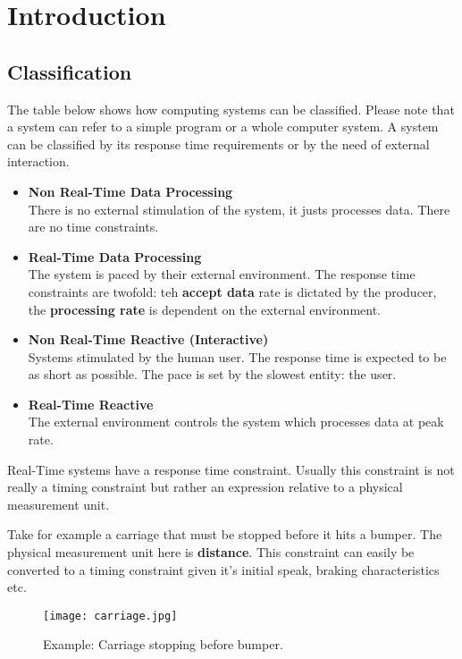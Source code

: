 \documentclass[../main.tex]{subfiles}
\begin{document}
\chapter{Introduction}

\section{Classification}

The table below shows how computing systems can be classified. Please note that a system can refer to a simple program or a whole computer system. A system can be classified by its response time requirements or by the need of external interaction. 

\begin{itemize}
	\item \textbf{Non Real-Time Data Processing} \\
	There is no external stimulation of the system, it justs processes data. There are no time constraints.
	\item \textbf{Real-Time Data Processing} \\
	The system is paced by their external environment. The response time constraints are twofold: teh \textbf{accept data} rate is dictated by the producer, the \textbf{processing rate} is dependent on the external environment.
	\item \textbf{Non Real-Time Reactive (Interactive)} \\
	Systems stimulated by the human user. The response time is expected to be as short as possible. The pace is set by the slowest entity: the user.
	\item \textbf{Real-Time Reactive} \\
	The external environment controls the system which processes data at peak rate.
\end{itemize}

Real-Time systems have a response time constraint. Usually this constraint is not really a timing constraint but rather an expression relative to a physical measurement unit.

\begin{exmp}
Take for example a carriage that must be stopped before it hits a bumper. The physical measurement unit here is \textbf{distance}. This constraint can easily be converted to a timing constraint given it's initial speak, braking characteristics etc. 
\begin{figure}[H]
    \centering
    \texttt{[image: carriage.jpg]}
    \caption{Example: Carriage stopping before bumper.}
    \label{carriage}
\end{figure}
\end{exmp}
\end{document}
